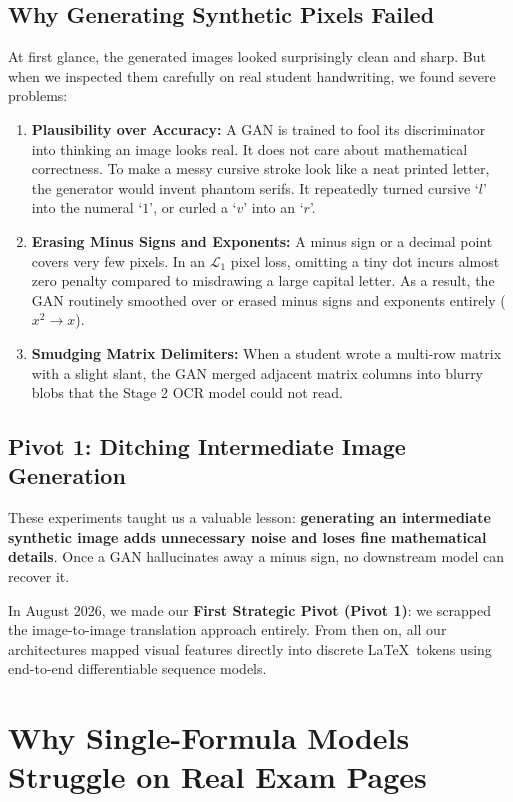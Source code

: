 \subsection{Why Generating Synthetic Pixels Failed}
At first glance, the generated images looked surprisingly clean and sharp. But when we inspected them carefully on real student handwriting, we found severe problems:
\begin{enumerate}
    \item \textbf{Plausibility over Accuracy:} A GAN is trained to fool its discriminator into thinking an image looks real. It does not care about mathematical correctness. To make a messy cursive stroke look like a neat printed letter, the generator would invent phantom serifs. It repeatedly turned cursive `$l$' into the numeral `$1$', or curled a `$v$' into an `$r$'.
    \item \textbf{Erasing Minus Signs and Exponents:} A minus sign or a decimal point covers very few pixels. In an $\mathcal{L}_1$ pixel loss, omitting a tiny dot incurs almost zero penalty compared to misdrawing a large capital letter. As a result, the GAN routinely smoothed over or erased minus signs and exponents entirely ($x^2 \to x$).
    \item \textbf{Smudging Matrix Delimiters:} When a student wrote a multi-row matrix with a slight slant, the GAN merged adjacent matrix columns into blurry blobs that the Stage 2 OCR model could not read.
\end{enumerate}

\subsection{Pivot 1: Ditching Intermediate Image Generation}
These experiments taught us a valuable lesson: \textbf{generating an intermediate synthetic image adds unnecessary noise and loses fine mathematical details}. Once a GAN hallucinates away a minus sign, no downstream model can recover it.

In August 2026, we made our \textbf{First Strategic Pivot (Pivot 1)}: we scrapped the image-to-image translation approach entirely. From then on, all our architectures mapped visual features directly into discrete \LaTeX\ tokens using end-to-end differentiable sequence models.

\section{Why Single-Formula Models Struggle on Real Exam Pages}
\label{sec:generalization_gap}

